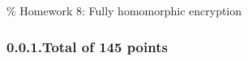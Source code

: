 \documentclass{article}
\begin{document}
\noindent{}\% Homework 8: Fully homomorphic encryption%
\newcommand{\zo}{\{0,1\}}
\newcommand{\E}{\mathbb{E}}
\newcommand{\Z}{\mathbb{Z}}
\newcommand{\getsr}{\leftarrow_R\;}
\newcommand{\Gp}{\mathbb{G}}
\newcommand{\iprod}[1]{\langle #1 \rangle}
\newcommand{\Epubcca}{E^{pub,cca}}
\newcommand{\Epubcpa}{E^{pub,cpa}}
\newcommand{\Epriv}{E^{priv,cca}}
\newcommand{\Sign}{S}
\newcommand{\Ver}{V}

\newcommand{\floor}[1]{\lfloor #1 \rfloor}
\newcommand{\ceil}[1]{\lceil #1 \rceil}

\newcommand{\cF}{\mathcal{F}}

\newcommand{\onand}{\overline{\wedge}}
\subsubsection{0.0.1.\hspace*{0.5em}Total of 145 points}\label{sec-total-of-145-points}%
\end{document}
